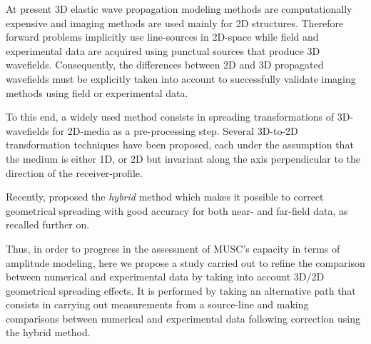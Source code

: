 \documentclass[manuscript,revised]{geophysics}
\begin{document}


\noindent At present 3D elastic wave propagation modeling methods are computationally expensive and imaging methods are used mainly for 2D structures. Therefore forward problems implicitly use line-sources in 2D-space while field and experimental data are acquired using punctual sources that produce 3D wavefields. Consequently, the differences between 2D and 3D propagated wavefields must be explicitly taken into account to successfully validate imaging methods using field or experimental data. 


\noindent To this end, a widely used method consists in spreading transformations of 3D-wavefields for 2D-media as a pre-processing step. Several 3D-to-2D transformation techniques have been proposed, each under the assumption that the medium is either 1D, or 2D but invariant along the axis perpendicular to the direction of the receiver-profile.

\noindent Recently, \citet{Forbriger_LSS_2014} proposed the \textit{hybrid} method which makes it possible to correct geometrical spreading with good accuracy for both near- and far-field data, as recalled further on.

\noindent Thus, in order to progress in the assessment of MUSC’s capacity in terms of amplitude modeling, here we propose a study carried out to refine the comparison between numerical and experimental data by taking into account 3D/2D geometrical spreading effects. It is performed by taking an alternative path that consists in carrying out measurements from a source-line and making comparisons between numerical and experimental data following correction using the hybrid method.
\end{document}
